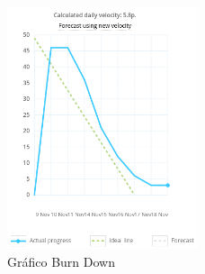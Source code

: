 \begin{figure}[!htb]
    \centering
    \includegraphics[width=0.5\textwidth]{figuras/burn_down.png}
    \caption{Gráfico Burn Down}
    \label{fig:burn_down}
\end{figure}